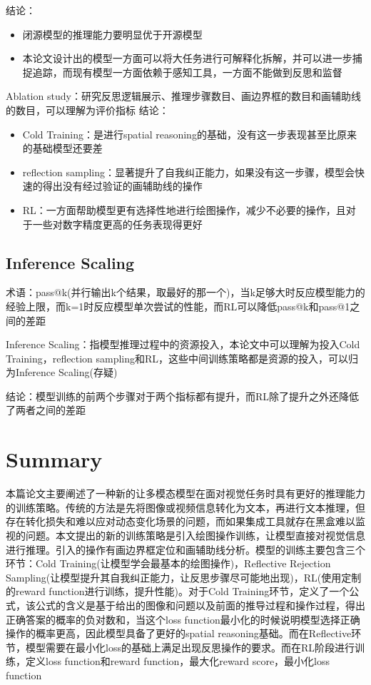 \documentclass[a4paper,12pt]{article}
\begin{document}
结论：
\begin{itemize}
    \item 闭源模型的推理能力要明显优于开源模型
    \item 本论文设计出的模型一方面可以将大任务进行可解释化拆解，并可以进一步捕捉追踪，而现有模型一方面依赖于感知工具，一方面不能做到反思和监督
\end{itemize}

Ablation study：研究反思逻辑展示、推理步骤数目、画边界框的数目和画辅助线的数目，可以理解为评价指标
结论：
\begin{itemize}
    \item Cold Training：是进行spatial reasoning的基础，没有这一步表现甚至比原来的基础模型还要差
    \item reflection sampling：显著提升了自我纠正能力，如果没有这一步骤，模型会快速的得出没有经过验证的画辅助线的操作
    \item RL：一方面帮助模型更有选择性地进行绘图操作，减少不必要的操作，且对于一些对数字精度更高的任务表现得更好
\end{itemize}

\subsection{Inference Scaling}
术语：pass@k(并行输出k个结果，取最好的那一个)，当k足够大时反应模型能力的经验上限，而k=1时反应模型单次尝试的性能，而RL可以降低pass@k和pass@1之间的差距

Inference Scaling：指模型推理过程中的资源投入，本论文中可以理解为投入Cold Training，reflection sampling和RL，这些中间训练策略都是资源的投入，可以归为Inference Scaling(存疑)

结论：模型训练的前两个步骤对于两个指标都有提升，而RL除了提升之外还降低了两者之间的差距

\section{Summary}
本篇论文主要阐述了一种新的让多模态模型在面对视觉任务时具有更好的推理能力的训练策略。传统的方法是先将图像或视频信息转化为文本，再进行文本推理，但存在转化损失和难以应对动态变化场景的问题，而如果集成工具就存在黑盒难以监视的问题。本文提出的新的训练策略是引入绘图操作训练，让模型直接对视觉信息进行推理。引入的操作有画边界框定位和画辅助线分析。模型的训练主要包含三个环节：Cold Training(让模型学会最基本的绘图操作)，Reflective Rejection Sampling(让模型提升其自我纠正能力，让反思步骤尽可能地出现)，RL(使用定制的reward function进行训练，提升性能)。对于Cold Training环节，定义了一个公式，该公式的含义是基于给出的图像和问题以及前面的推导过程和操作过程，得出正确答案的概率的负对数和，当这个loss function最小化的时候说明模型选择正确操作的概率更高，因此模型具备了更好的spatial reasoning基础。而在Reflective环节，模型需要在最小化loss的基础上满足出现反思操作的要求。而在RL阶段进行训练，定义loss function和reward function，最大化reward score，最小化loss function
\end{document}
